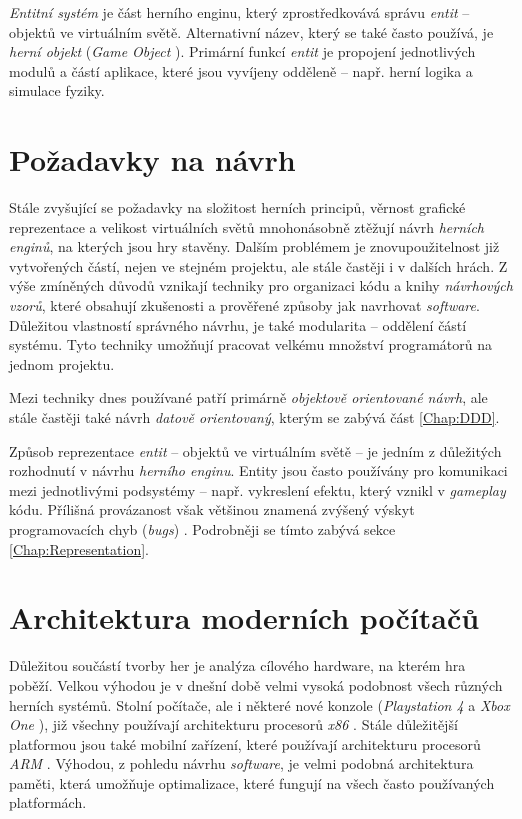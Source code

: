 \emph{Entitní systém} je část herního enginu, který zprostředkovává správu \emph{entit} -- objektů ve virtuálním světě. Alternativní název, který se také často používá, je \emph{herní objekt} (\emph{Game Object} \cite{UnityGo}). Primární funkcí \emph{entit} je propojení jednotlivých modulů a částí aplikace, které jsou vyvíjeny odděleně -- např. herní logika a simulace fyziky.


\section{Požadavky na návrh}

Stále zvyšující se požadavky na složitost herních principů, věrnost grafické reprezentace a velikost virtuálních světů mnohonásobně ztěžují návrh \emph{herních enginů}, na kterých jsou hry stavěny. Dalším problémem je znovupoužitelnost již vytvořených částí, nejen ve stejném projektu, ale stále častěji i v dalších hrách. Z výše zmíněných důvodů vznikají techniky pro organizaci kódu a knihy \emph{návrhových vzorů}\cite{DesignPatterns}\cite{GameDesignPatterns}, které obsahují zkušenosti a prověřené způsoby jak navrhovat \emph{software}. Důležitou vlastností správného návrhu, je také modularita -- oddělení částí systému. Tyto techniky umožňují pracovat velkému množství programátorů na jednom projektu.

Mezi techniky dnes používané patří primárně \emph{objektově orientované návrh}, ale stále častěji také návrh \emph{datově orientovaný}, kterým se zabývá část \ref{Chap:DDD}.

Způsob reprezentace \emph{entit} -- objektů ve virtuálním světě -- je jedním z důležitých rozhodnutí v návrhu \emph{herního enginu}. Entity jsou často používány pro komunikaci mezi jednotlivými podsystémy -- např. vykreslení efektu, který vznikl v \emph{gameplay} kódu. Přílišná provázanost však většinou znamená zvýšený výskyt programovacích chyb (\emph{bugs}) \cite{GameDesignPatterns}. Podrobněji se tímto zabývá sekce \ref{Chap:Representation}.

\section{Architektura moderních počítačů}

Důležitou součástí tvorby her je analýza cílového hardware, na kterém hra poběží. Velkou výhodou je v dnešní době velmi vysoká podobnost všech různých herních systémů. Stolní počítače, ale i některé nové konzole (\emph{Playstation 4} a \emph{Xbox One} \cite{Ps4Xbox}), již všechny používají architekturu procesorů \emph{x86} \cite{IntelX86-64} \cite{AmdX86-64}. Stále důležitější platformou jsou také mobilní zařízení, které používají architekturu procesorů \emph{ARM} \cite{ARM}. Výhodou, z pohledu návrhu \emph{software}, je velmi podobná architektura paměti, která umožňuje optimalizace, které fungují na všech často používaných platformách.

